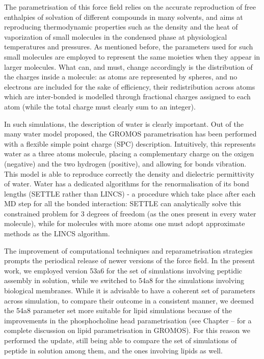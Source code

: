 The parametrisation of this force field relies on the accurate reproduction of free enthalpies of solvation of different compounds in many solvents, and aims at reproducing thermodynamic properties such as the density and the heat of vaporization of small molecules in the condensed phase at physiological temperatures and pressures.
%
As mentioned before, the parameters used for such small molecules are employed to represent the same moieties when they appear in larger molecules. What can, and must, change accordingly is the distribution of the charges inside a molecule: as atoms are represented by spheres, and no electrons are included for the sake of efficiency, their redistribution across atoms which are inter-bonded is modelled through fractional charges assigned to each atom (while the total charge must clearly sum to an integer).

In such simulations, the description of water is clearly important. Out of the many water model proposed, the GROMOS parametrisation has been performed with a flexible simple point charge (SPC) description. Intuitively, this represents water as a three atoms molecule, placing a complementary charge on the oxigen (negative) and the two hydrogen (positive), and allowing for bonds vibration. This model is able to reproduce correctly the density and dielectric permittivity of water. Water has a dedicated algorithms for the renormalisation of its bond lengths (SETTLE rather than LINCS) - a procedure which take place after each MD step for all the bonded interaction: SETTLE can analytically solve this constrained problem for 3 degrees of freedom (as the ones present in every water molecule), while for molecules with more atoms one must adopt approximate methods as the LINCS algorithm.

The improvement of computational techniques and reparametrisation strategies prompts the periodical release of newer versions of the force field. In the present work, we employed version 53a6 \cite{53a6} for the set of simulations involving peptidic assembly in solution, while we switched to 54a8 \cite{54a8} for the simulations involving biological membranes. While it is advisable to have a coherent set of parameters across simulation, to compare their outcome in a consistent manner, we deemed the 54a8 parameter set more suitable for lipid simulations because of the improvements in the phosphocholine head parametrisation (see Chapter -- for a complete discussion on lipid parametrisation in GROMOS). For this reason we performed the update, still being able to compare the set of simulations of peptide in solution among them, and the ones involving lipids as well.



